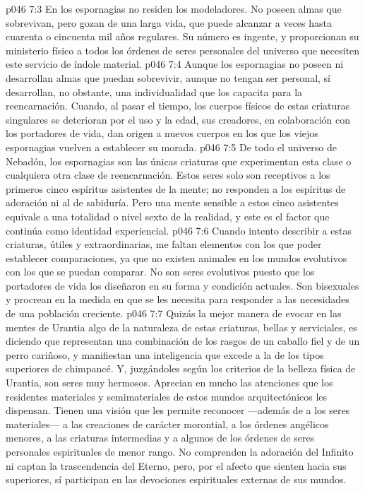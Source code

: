 \vs p046 7:3 En los espornagias no residen los modeladores. No poseen almas que sobrevivan, pero gozan de una larga vida, que puede alcanzar a veces hasta cuarenta o cincuenta mil años regulares. Su número es ingente, y proporcionan su ministerio físico a todos los órdenes de seres personales del universo que necesiten este servicio de índole material.
\vs p046 7:4 \pc Aunque los espornagias no poseen ni desarrollan almas que puedan sobrevivir, aunque no tengan ser personal, sí desarrollan, no obstante, una individualidad que los capacita para la reencarnación. Cuando, al pasar el tiempo, los cuerpos físicos de estas criaturas singulares se deterioran por el uso y la edad, sus creadores, en colaboración con los portadores de vida, dan origen a nuevos cuerpos en los que los viejos espornagias vuelven a establecer su morada.
\vs p046 7:5 De todo el universo de Nebadón, los espornagias son las únicas criaturas que experimentan esta clase o cualquiera otra clase de reencarnación. Estos seres solo son receptivos a los primeros cinco espíritus asistentes de la mente; no responden a los espíritus de adoración ni al de sabiduría. Pero una mente sensible a estos cinco asistentes equivale a una totalidad o nivel sexto de la realidad, y este es el factor que continúa como identidad experiencial.
\vs p046 7:6 \pc Cuando intento describir a estas criaturas, útiles y extraordinarias, me faltan elementos con los que poder establecer comparaciones, ya que no existen animales en los mundos evolutivos con los que se puedan comparar. No son seres evolutivos puesto que los portadores de vida los diseñaron en su forma y condición actuales. Son bisexuales y procrean en la medida en que se les necesita para responder a las necesidades de una población creciente.
\vs p046 7:7 Quizás la mejor manera de evocar en las mentes de Urantia algo de la naturaleza de estas criaturas, bellas y serviciales, es diciendo que representan una combinación de los rasgos de un caballo fiel y de un perro cariñoso, y manifiestan una inteligencia que excede a la de los tipos superiores de chimpancé. Y, juzgándoles según los criterios de la belleza física de Urantia, son seres muy hermosos. Aprecian en mucho las atenciones que los residentes materiales y semimateriales de estos mundos arquitectónicos les dispensan. Tienen una visión que les permite reconocer ---además de a los seres materiales--- a las creaciones de carácter morontial, a los órdenes angélicos menores, a las criaturas intermedias y a algunos de los órdenes de seres personales espirituales de menor rango. No comprenden la adoración del Infinito ni captan la trascendencia del Eterno, pero, por el afecto que sienten hacia sus superiores, sí participan en las devociones espirituales externas de sus mundos.
